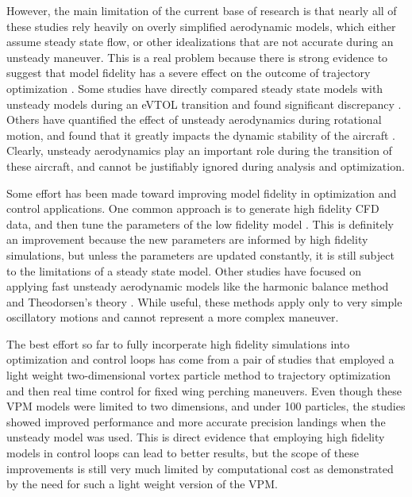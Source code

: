 \documentclass[12pt, letterpaper]{article}
\begin{document}
However, the main limitation of the current base of research is that nearly all of these studies rely heavily on overly simplified aerodynamic models, which either assume steady state flow, or other idealizations that are not accurate during an unsteady maneuver.  This is a real problem because there is strong evidence to suggest that model fidelity has a severe effect on the outcome of trajectory optimization \cite{anderson2021acomparison}.  Some studies have directly compared steady state models with unsteady models during an eVTOL transition and found significant discrepancy \cite{tagg2024trajectory}.  Others have quantified the effect of unsteady aerodynamics during rotational motion, and found that it greatly impacts the dynamic stability of the aircraft \cite{wang2012unsteady}.  Clearly, unsteady aerodynamics play an important role during the transition of these aircraft, and cannot be justifiably ignored during analysis and optimization. 

Some effort has been made toward improving model fidelity in optimization and control applications.  One common approach is to generate high fidelity CFD data, and then tune the parameters of the low fidelity model \cite{dean2008aircraft, tian2020cfd, gortz2007towards}.  This is definitely an improvement because the new parameters are informed by high fidelity simulations, but unless the parameters are updated constantly, it is still subject to the limitations of a steady state model.  Other studies have focused on applying fast unsteady aerodynamic models like the harmonic balance method \cite{thomas2004modeling} and Theodorsen's theory \cite{bhoir2004output}.  While useful, these methods apply only to very simple oscillatory motions and cannot represent a more complex maneuver.  

The best effort so far to fully incorperate high fidelity simulations into optimization and control loops has come from a pair of studies that employed a light weight two-dimensional vortex particle method to trajectory optimization \cite{perrotta2023planningcontroldynamicmorphingwing} and then real time control \cite{gupta2025realtimeplanningcontrolvortex} for fixed wing perching maneuvers.  Even though these VPM models were limited to two dimensions, and under 100 particles, the studies showed improved performance and more accurate precision landings when the unsteady model was used.  This is direct evidence that employing high fidelity models in control loops can lead to better results, but the scope of these improvements is still very much limited by computational cost as demonstrated by the need for such a light weight version of the VPM.   
\end{document}
